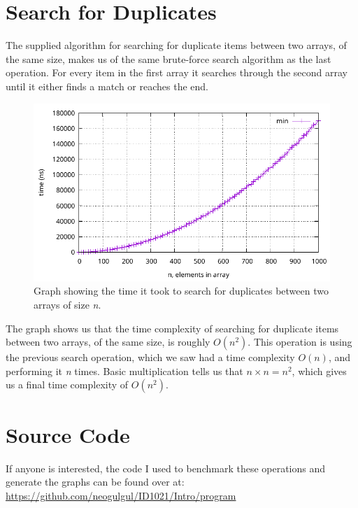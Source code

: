 \documentclass[a4paper, 11pt]{article}
\begin{document}
\section{Search for Duplicates}
	The supplied algorithm for searching for duplicate items between two arrays, of the same size, makes us of the same brute-force search algorithm as the last operation.
	For every item in the first array it searches through the second array until it either finds a match or reaches the end.
	\par
	\begin{figure}[h]
		\centering
		\includegraphics[scale=0.8]{graphs/plot4.pdf}
		\caption{
			Graph showing the time it took to search for duplicates between two arrays of size \textit{n}.
		}
	\end{figure}
	The graph shows us that the time complexity of searching for duplicate items between two arrays, of the same size, is roughly \(O(n^2)\).
	This operation is using the previous search operation, which we saw had a time complexity \(O(n)\), and performing it \textit{n} times.
	Basic multiplication tells us that \(n \times n = n^2\), which gives us a final time complexity of \(O(n^2)\).

\section{Source Code}
	If anyone is interested, the code I used to benchmark these operations and generate the graphs can be found over at: \url{https://github.com/neogulgul/ID1021/Intro/program}
\end{document}

